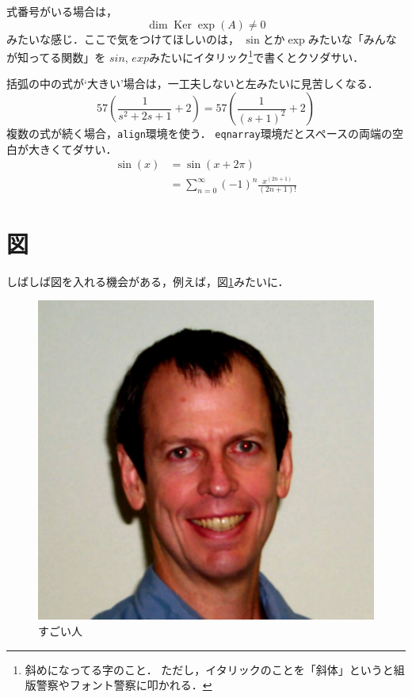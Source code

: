 \documentclass[a4j, dvipdfmx]{jsarticle}
\begin{document}
  式番号がいる場合は，
    \begin{equation}
      \operatorname{dim}\operatorname{Ker}
        \exp(A) \neq 0
    \end{equation}
  みたいな感じ．ここで気をつけてほしいのは，
  $\sin$とか$\exp$みたいな「みんなが知ってる関数」を
  $sin$, $exp$みたいにイタリック\footnote{斜めになってる字のこと．
    ただし，イタリックのことを「斜体」というと組版警察やフォント警察に叩かれる．}で書くとクソダサい．
  \par 括弧の中の式が`大きい'場合は，一工夫しないと左みたいに見苦しくなる．
    \begin{equation}
      57(\frac{1}{s^2 + 2s + 1} + 2) =57\left(\frac{1}{(s + 1)^2} + 2 \right)
    \end{equation}
  複数の式が続く場合，\texttt{align}環境を使う．
  \texttt{eqnarray}環境だとスペースの両端の空白が大きくてダサい．
    \begin{align}
      \sin(x) &= \sin(x + 2\pi) \\
      &= \sum_{n = 0}^{\infty} (-1)^{n}\frac{x^{(2n + 1)}}{(2n + 1)!}
    \end{align}
\section{図}
  しばしば図を入れる機会がある，例えば，図\ref{pht_doyle}みたいに．
    \begin{figure}[tbp]
      \centering
      \includegraphics[width = 0.95\columnwidth]{figure/doyle_photo.jpg}
      \caption{すごい人} \label{pht_doyle}
    \end{figure}
\end{document}
